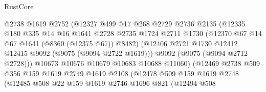\begin{lexlean}{RustCore}
\begin{coremodule}
                                @2738
                                @1619
                                @2752
                                (@12327
                                  @499
                                  @17
                                  @268
                                  @2729
                                  @2736
                                  @2135
                                  (@12335
                                    @180
                                    @335
                                    @14
                                    @16
                                    @1641
                                    @2728
                                    @2735
                                    @1724
                                    @2711
                                    @1730
                                    (@12370 @67 @14 @67 @1641 (@8360 (@12375 @67)) @8482)
                                    (@12406
                                      @2721
                                      @1730
                                      @12412
                                      @12415
                                      @9092
                                      (@9075 (@9094 @2722 @1619)))
                                    @9092
                                    (@9075 (@9094 @2712 @2728)))
                                  @10673
                                  @10676
                                  @10679
                                  @10683
                                  @10688
                                  @11060)
                                (@12469
                                  @2738
                                  @509
                                  @356
                                  @159
                                  @1619
                                  @2749
                                  @1619
                                  @2108
                                  (@12478
                                    @509
                                    @159
                                    @1619
                                    @2748
                                    (@12485
                                      @508
                                      @22
                                      @159
                                      @1619
                                      @2746
                                      @1696
                                      @821
                                      (@12494
                                        @508

\end{coremodule}
\end{lexlean}
